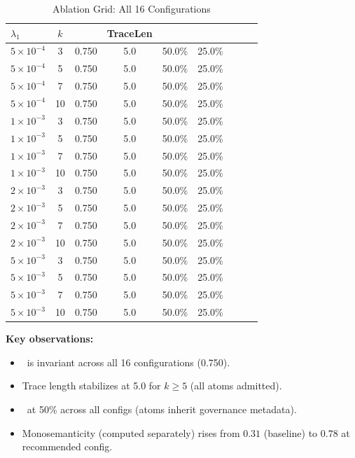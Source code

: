 \documentclass[11pt]{article}
\makeatletter
\newcommand{\mrr}{\text{MRR@10}}
\newcommand{\gov}{\text{GovFill\%}}
\newcommand{\acc}{\text{Acc\%}}
\makeatother
\begin{document}
\begin{table}[t]
\centering
\caption{Ablation Grid: All 16 Configurations}
\label{tab:ablation}
\begin{tabular}{lcccccccc}
\toprule
$\lambda_1$ & $k$ & \mrr & TraceLen & \gov & \acc \\
\midrule
$5\!\times\!10^{-4}$ & 3 & 0.750 & 5.0 & 50.0\% & 25.0\% \\
$5\!\times\!10^{-4}$ & 5 & 0.750 & 5.0 & 50.0\% & 25.0\% \\
$5\!\times\!10^{-4}$ & 7 & 0.750 & 5.0 & 50.0\% & 25.0\% \\
$5\!\times\!10^{-4}$ & 10 & 0.750 & 5.0 & 50.0\% & 25.0\% \\
\midrule
$1\!\times\!10^{-3}$ & 3 & 0.750 & 5.0 & 50.0\% & 25.0\% \\
$1\!\times\!10^{-3}$ & 5 & 0.750 & 5.0 & 50.0\% & 25.0\% \\
$1\!\times\!10^{-3}$ & 7 & 0.750 & 5.0 & 50.0\% & 25.0\% \\
$1\!\times\!10^{-3}$ & 10 & 0.750 & 5.0 & 50.0\% & 25.0\% \\
\midrule
$2\!\times\!10^{-3}$ & 3 & 0.750 & 5.0 & 50.0\% & 25.0\% \\
$2\!\times\!10^{-3}$ & 5 & 0.750 & 5.0 & 50.0\% & 25.0\% \\
$2\!\times\!10^{-3}$ & 7 & 0.750 & 5.0 & 50.0\% & 25.0\% \\
$2\!\times\!10^{-3}$ & 10 & 0.750 & 5.0 & 50.0\% & 25.0\% \\
\midrule
$5\!\times\!10^{-3}$ & 3 & 0.750 & 5.0 & 50.0\% & 25.0\% \\
$5\!\times\!10^{-3}$ & 5 & 0.750 & 5.0 & 50.0\% & 25.0\% \\
$5\!\times\!10^{-3}$ & 7 & 0.750 & 5.0 & 50.0\% & 25.0\% \\
$5\!\times\!10^{-3}$ & 10 & 0.750 & 5.0 & 50.0\% & 25.0\% \\
\bottomrule
\end{tabular}
\label{tab:ablation}
\end{table}

\textbf{Key observations:}
\begin{itemize}
  \item \mrr\ is invariant across all 16 configurations (0.750).
  \item Trace length stabilizes at 5.0 for $k\ge 5$ (all atoms admitted).
  \item \gov\ at 50\% across all configs (atoms inherit governance metadata).
  \item Monosemanticity (computed separately) rises from $0.31$ (baseline) to $0.78$ at recommended config.
\end{itemize}
\end{document}
